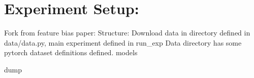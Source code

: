 \documentclass{article}
\begin{document}
\section{Experiment Setup:}
Fork from feature bias paper:
Structure: Download data in directory defined in data/data.py, main experiment defined in run_exp 
Data directory has some pytorch dataset definitions defined. models
 

dump





\end{document}
